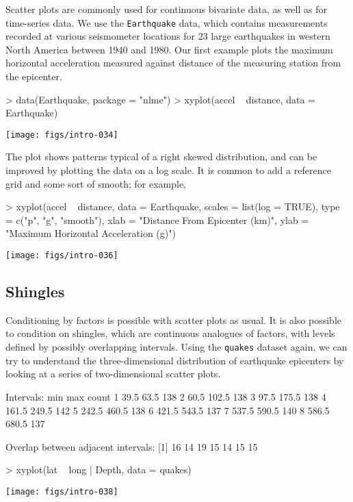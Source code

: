 \documentclass[10pt]{article}
\newcommand{\code}[1]{\texttt{#1}}
\begin{document}
Scatter plots are commonly used for continuous bivariate data, as well
as for time-series data.  We use the \code{Earthquake} data, which
contains measurements recorded at various seismometer locations for 23
large earthquakes in western North America between 1940 and 1980.  Our
first example plots the maximum horizontal acceleration measured
against distance of the measuring station from the epicenter.
\begin{Schunk}
\begin{Sinput}
> data(Earthquake, package = "nlme")
> xyplot(accel ~ distance, data = Earthquake)
\end{Sinput}
\end{Schunk}
\begin{center}
\texttt{[image: figs/intro-034]}
\end{center}
The plot shows patterns typical of a right skewed distribution, and
can be improved by plotting the data on a log scale.  It is common to
add a reference grid and some sort of smooth; for example,
\begin{Schunk}
\begin{Sinput}
> xyplot(accel ~ distance, data = Earthquake, scales = list(log = TRUE), 
         type = c("p", "g", "smooth"), xlab = "Distance From Epicenter (km)",
         ylab = "Maximum Horizontal Acceleration (g)")
\end{Sinput}
\end{Schunk}
\begin{center}
\texttt{[image: figs/intro-036]}
\end{center}


\newpage

\subsection*{Shingles}

Conditioning by factors is possible with scatter plots as usual.  It
is also possible to condition on shingles, which are continuous
analogues of factors, with levels defined by possibly overlapping
intervals.  Using the \code{quakes} dataset again, we can try to
understand the three-dimensional distribution of earthquake epicenters
by looking at a series of two-dimensional scatter plots.
\begin{Schunk}
\begin{Soutput}
Intervals:
    min   max count
1  39.5  63.5   138
2  60.5 102.5   138
3  97.5 175.5   138
4 161.5 249.5   142
5 242.5 460.5   138
6 421.5 543.5   137
7 537.5 590.5   140
8 586.5 680.5   137

Overlap between adjacent intervals:
[1] 16 14 19 15 14 15 15
\end{Soutput}
\begin{Sinput}
> xyplot(lat ~ long | Depth, data = quakes)
\end{Sinput}
\end{Schunk}
\begin{center}
\texttt{[image: figs/intro-038]}
\end{center}
\end{document}
